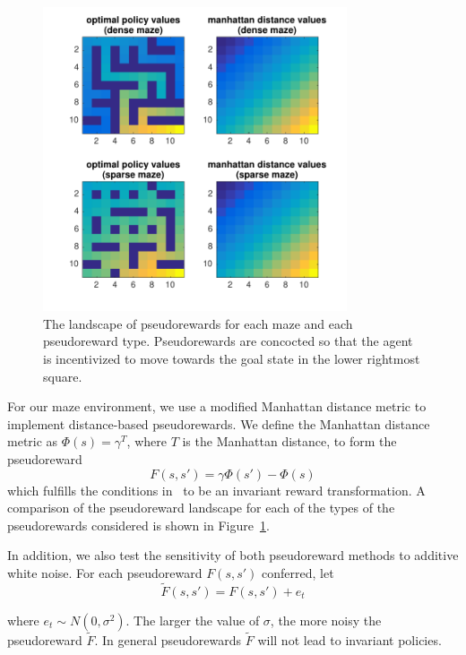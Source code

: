 \documentclass[notitlepage]{article}
\begin{document}
\begin{figure}[ht]
\centering
\includegraphics[width=0.8\textwidth]{value_landscapes}
\caption{The landscape of pseudorewards for each maze and each pseudoreward type. Pseudorewards are concocted so that the agent is incentivized to move towards the goal state in the lower rightmost square.}
\label{fig:value-landscapes}
\end{figure}

For our maze environment, we use a modified Manhattan distance metric to implement distance-based pseudorewards. We define the Manhattan distance metric as $\Phi(s) = \gamma^T$, where $T$ is the Manhattan distance, to form the pseudoreward
\begin{equation}
F(s, s') = \gamma \Phi(s') - \Phi(s)
\end{equation} 
which fulfills the conditions in~\cite{ng1999policy} to be an invariant reward transformation. A comparison of the pseudoreward landscape for each of the types of the pseudorewards considered is shown in Figure~\ref{fig:value-landscapes}.

In addition, we also test the sensitivity of both pseudoreward methods to additive white noise. For each pseudoreward $F(s, s')$ conferred, let
\begin{equation}
\tilde{F}(s, s') = F(s, s') + e_t
\end{equation} 

\noindent where $e_t \sim N(0, \sigma^2)$. The larger the value of $\sigma$, the more noisy the pseudoreward $\tilde{F}$. In general pseudorewards $\tilde{F}$ will not lead to invariant policies.
\end{document}
